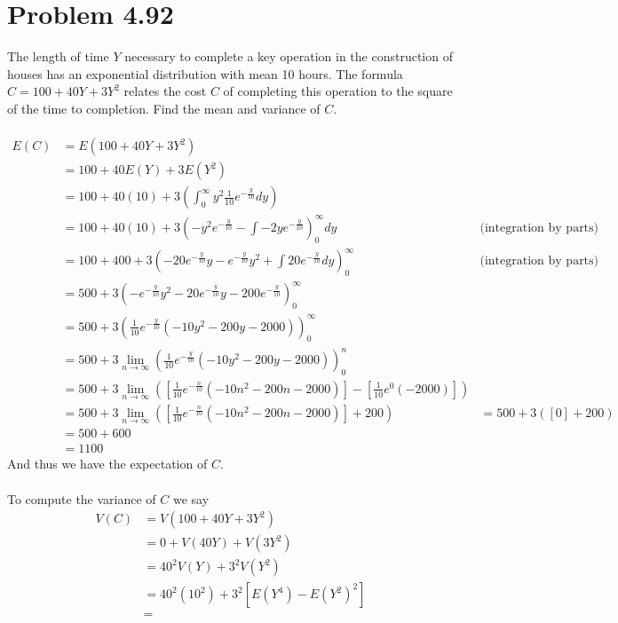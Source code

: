 \documentclass{article}
\theoremstyle{definition}
\begin{document}
\section*{Problem 4.92}
    The length of time $Y$ necessary to complete a key operation in the construction
    of houses has an exponential distribution with mean 10 hours. The formula $C = 
    100 + 40Y + 3Y^2$ relates the cost $C$ of completing this operation to the square
    of the time to completion. Find the mean and variance of $C$.\\\\
    \begin{align*}
        E(C) &= E(100 + 40Y + 3Y^2)\\
        &= 100 + 40 E(Y) + 3 E(Y^2)\\
        &= 100 + 40 (10) + 3 \left(\int_0^\infty y^2 \frac{1}{10} e^{-\frac{y}{10}} dy\right)\\
        &= 100 + 40 (10) + 3 \left(-y^2 e^{-\frac{y}{10}} - \int-2y e^{-\frac{y}{10}}\right)_0^\infty dy & \text{(integration by parts)}\\
        &= 100 + 400 + 3 \left( -20e^{-\frac{y}{10}} y - e ^{-\frac{y}{10}}y^2 + \int 20 e^{-\frac{y}{10}} dy \right)_0^\infty & \text{(integration by parts)}\\
        &= 500 + 3 \left( -e^{-\frac{y}{10}} y^2 - 20 e^{-\frac{y}{10}} y - 200 e^{-\frac{y}{10}}\right)_0^\infty\\
        &= 500 + 3 \left( \frac{1}{10}e^{-\frac{y}{10}}(-10y^2 - 200y - 2000) \right)_0^\infty\\
        &= 500 + 3 \lim_{n \rightarrow \infty} \left(\frac{1}{10}e^{-\frac{y}{10}}(-10y^2 - 200y - 2000)\right)_0^n\\
        &= 500 + 3 \lim_{n \rightarrow \infty} \left( \left[ \frac{1}{10}e^{-\frac{n}{10}}(-10n^2 - 200n - 2000) \right] - \left[\frac{1}{10}e^0 (-2000)\right]\right)\\
        &= 500 + 3 \lim_{n \rightarrow \infty} \left( \left[ \frac{1}{10}e^{-\frac{n}{10}}(-10n^2 - 200n - 2000) \right] + 200 \right)
        &= 500 + 3 ([0] + 200)\\
        &= 500 + 600\\
        &= 1100
    \end{align*}
    And thus we have the expectation of $C$.\\\\

    To compute the variance of $C$ we say
    \begin{align*}
        V(C) &= V(100 + 40Y + 3Y^2)\\
        &= 0 + V(40Y) + V(3Y^2)\\
        &= 40^2 V(Y) + 3^2 V(Y^2)\\
        &= 40^2 (10^2) + 3^2[E(Y^4) - E(Y^2)^2]\\
        &= 
    \end{align*}
    
\end{document}
